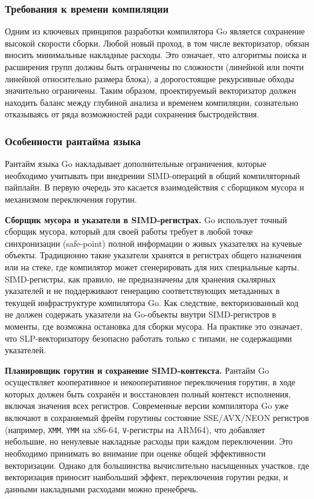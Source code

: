 \subsubsection{Требования к времени компиляции}

Одним из ключевых принципов разработки компилятора Go является сохранение высокой скорости сборки. Любой новый проход, в том числе векторизатор, обязан вносить минимальные накладные расходы.
Это означает, что алгоритмы поиска и расширения групп должны быть ограничены по сложности (линейной или почти линейной относительно размера блока), 
а дорогостоящие рекурсивные обходы значительно ограничены.
Таким образом, проектируемый векторизатор должен находить баланс между глубиной анализа и временем компиляции, сознательно отказываясь от ряда возможностей ради сохранения быстродействия.

\subsubsection{Особенности рантайма языка}
\label{sec:go_runtime}

Рантайм языка Go накладывает дополнительные ограничения, которые необходимо учитывать при внедрении SIMD-операций в общий компиляторный пайплайн.
В первую очередь это касается взаимодействия с сборщиком мусора и механизмом переключения горутин.

\textbf{Сборщик мусора и указатели в SIMD-регистрах.} Go использует точный сборщик мусора, который для своей работы требует в
любой точке синхронизации (safe-point) полной информации о живых указателях на кучевые объекты. 
Традиционно такие указатели хранятся в регистрах общего назначения или на стеке, где компилятор может сгенерировать для них специальные карты. 
SIMD-регистры, как правило, не предназначены для хранения скалярных указателей и не поддерживают генерацию соответствующих метаданных в текущей инфраструктуре компилятора Go. 
Как следствие, векторизованный код не должен содержать указатели на Go-объекты внутри SIMD-регистров в моменты, где возможна остановка для сборки мусора. 
На практике это означает, что SLP-векторизатору безопасно работать только с типами, не содержащими указателей.

\textbf{Планировщик горутин и сохранение SIMD-контекста.} Рантайм Go осуществляет кооперативное и некооперативное переключения горутин, 
в ходе которых должен быть сохранён и восстановлен полный контекст исполнения, включая значения всех регистров.
Современные версии компилятора Go уже включают в сохраняемый фрейм горутины состояние SSE/AVX/NEON регистров (например, \texttt{XMM}, \texttt{YMM} на x86-64, \texttt{V}-регистры на ARM64), 
что добавляет небольшие, но ненулевые накладные расходы при каждом переключении. Это необходимо принимать во внимание при оценке общей эффективности векторизации. 
Однако для большинства вычислительно насыщенных участков, где векторизация приносит наибольший эффект, переключения горутин редки, и данными накладными расходами можно пренебречь.

